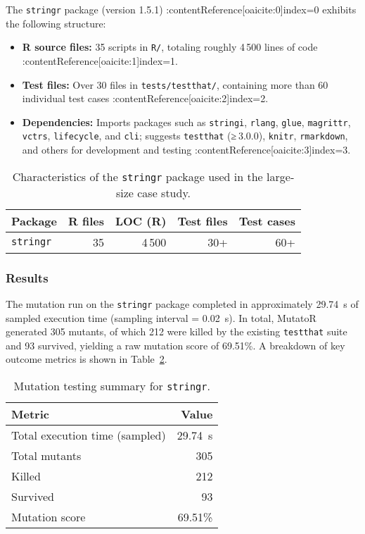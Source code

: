 The \texttt{stringr} package (version 1.5.1) :contentReference[oaicite:0]{index=0} exhibits the following structure:

\begin{itemize}
  \item \textbf{R source files:} 35 scripts in \texttt{R/}, totaling roughly 4\,500 lines of code :contentReference[oaicite:1]{index=1}.
  \item \textbf{Test files:} Over 30 files in \texttt{tests/testthat/}, containing more than 60 individual test cases :contentReference[oaicite:2]{index=2}.
  \item \textbf{Dependencies:} Imports packages such as \texttt{stringi}, \texttt{rlang}, \texttt{glue}, \texttt{magrittr}, \texttt{vctrs}, \texttt{lifecycle}, and \texttt{cli}; suggests \texttt{testthat} (≥ 3.0.0), \texttt{knitr}, \texttt{rmarkdown}, and others for development and testing :contentReference[oaicite:3]{index=3}.
\end{itemize}

\begin{table}[htbp]
  \centering
  \begin{tabular}{lrrrr}
    \hline\hline
    Package & R files & LOC (R) & Test files & Test cases \\
    \hline
    \texttt{stringr} & 35 & 4\,500 & 30+ & 60+ \\
    \hline
  \end{tabular}
  \caption{Characteristics of the \texttt{stringr} package used in the large‐size case study.}
  \label{tab:stringr-metrics}
\end{table}

\subsubsection{Results}

The mutation run on the \texttt{stringr} package completed in approximately 29.74~s of sampled execution time (sampling interval = 0.02~s).  In total, MutatoR generated 305 mutants, of which 212 were killed by the existing \texttt{testthat} suite and 93 survived, yielding a raw mutation score of 69.51\%.  A breakdown of key outcome metrics is shown in Table~\ref{tab:stringr-summary}.

\begin{table}[htbp]
  \centering
  \begin{tabular}{lr}
    \hline\hline
    Metric & Value \\
    \hline
    Total execution time (sampled) & 29.74~s \\
    Total mutants                  & 305   \\
    Killed                         & 212   \\
    Survived                       & 93    \\
    Mutation score                 & 69.51\% \\
    \hline
  \end{tabular}
  \caption{Mutation testing summary for \texttt{stringr}.}
  \label{tab:stringr-summary}
\end{table}

